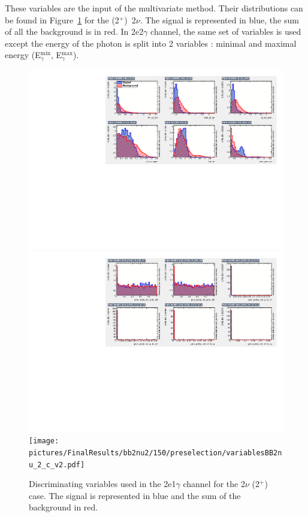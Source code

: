 \documentclass[main.tex]{subfiles}
\begin{document}
\NI These variables are the input of the multivariate method. Their distributions can be found in Figure~\ref{Variables14TMVA2nu2} for the (2$^+$)~2$\nu$. The signal is represented in blue, the sum of all the background is in red. In 2e2$\gamma$ channel, the same set of variables  is used except the energy of the photon is split into 2 variables : minimal and maximal energy (E$_{\gamma}^{\text{min}}$, E$_{\gamma}^{\text{max}}$).

\begin{figure} [h!]
\begin{center}
\includegraphics[scale=0.59]{pictures/FinalResults/bb2nu2/150/preselection/variablesBB2nu_2_a.pdf}
\includegraphics[scale=0.59]{pictures/FinalResults/bb2nu2/150/preselection/variablesBB2nu_2_b.pdf}
\texttt{[image: pictures/FinalResults/bb2nu2/150/preselection/variablesBB2nu\_2\_c\_v2.pdf]}
\end{center}
\caption{Discriminating variables used in the 2e1$\gamma$ channel for the 2$\nu$ (2$^+$) case. The signal is represented in blue and the sum of the background in red.}
\label{Variables14TMVA2nu2}
\end{figure}
\end{document}
